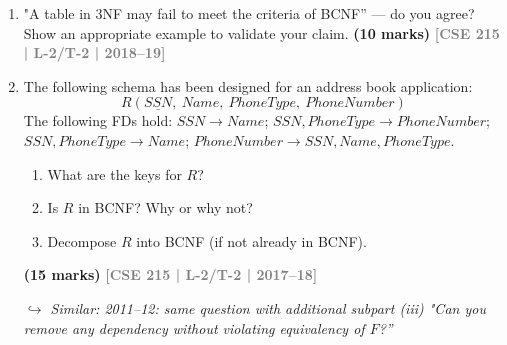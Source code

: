 \documentclass[12pt]{article}
\newcommand{\yr}[1]{\hfill\textcolor{gray}{\small\textbf{[#1]}}}
\newcommand{\mk}[1]{\textcolor{orange!70!black}{\small\textbf{(#1 marks)}}}
\newcommand{\variant}[1]{\par\vspace{1pt}\textcolor{blue!50!black}%
  {\footnotesize\textit{$\hookrightarrow$ Similar: #1}}}
\begin{document}
\begin{enumerate}
  \noindent \textbf{StaffPropertyInspection} \\[1ex]
\begin{center}
\renewcommand{\arraystretch}{1.5} %
\begin{tabular}{|l|l|l|p{3.5cm}|p{4cm}|l|l|l|}
\hline
\textbf{propertyNo} & \textbf{iDate} & \textbf{iTime} & \textbf{pAddress} & \textbf{comments} & \textbf{staffNo} & \textbf{sName} & \textbf{carReg} \\
\hline \hline
PG4  & 18-Oct-00 & 10.00 & 6 Lawrence St, Glasgow & Need to replace crockery   & SG37 & Ann Beech  & M231 JGR \\ \hline
PG4  & 22-Apr-01 & 09.00 & 6 Lawrence St, Glasgow & In good order              & SG14 & David Ford & M533 HDR \\ \hline
PG4  & 1-Oct-01  & 12.00 & 6 Lawrence St, Glasgow & Damp rot in bathroom       & SG14 & David Ford & N721 HFR \\ \hline
PG16 & 22-Apr-01 & 13.00 & 5 Novar Dr, Glasgow    & Replace living room carpet & SG14 & David Ford & M533 HDR \\ \hline
PG16 & 24-Oct-01 & 14.00 & 5 Novar Dr, Glasgow    & Good condition             & SG37 & Ann Beech  & N721 HFR \\ 
\hline
\end{tabular}
\end{center}
\mk{10} \yr{CSE 215 | L-2/T-2 | 2018--19}


\item "A table in 3NF may fail to meet the criteria of BCNF'' --- do you agree? Show an appropriate example to validate your claim.
\mk{10} \yr{CSE 215 | L-2/T-2 | 2018--19}


\item The following schema has been designed for an address book application:
\[R(\underline{SSN},\ Name,\ PhoneType,\ PhoneNumber)\]
The following FDs hold: $SSN \to Name$;\; $SSN, PhoneType \to PhoneNumber$;\; $SSN, PhoneType \to Name$;\; $PhoneNumber \to SSN, Name, PhoneType$.
\begin{enumerate}
  \item What are the keys for $R$?
  \item Is $R$ in BCNF? Why or why not?
  \item Decompose $R$ into BCNF (if not already in BCNF).
\end{enumerate}
\mk{15} \yr{CSE 215 | L-2/T-2 | 2017--18}
\variant{2011--12: same question with additional subpart (iii) "Can you remove any dependency without violating equivalency of $F$?''}



\end{enumerate}
\end{document}

